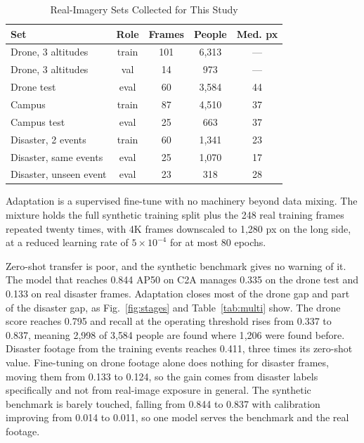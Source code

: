 \documentclass[conference,a4paper]{IEEEtran}
\begin{document}
\begin{table}[htbp]
\caption{Real-Imagery Sets Collected for This Study}
\label{tab:real}
\begin{center}
\small
\setlength{\tabcolsep}{4pt}
\begin{tabular}{|l|c|c|c|c|}
\hline
\textbf{Set} & \textbf{Role} & \textbf{Frames} & \textbf{People} & \textbf{Med. px} \\
\hline
Drone, 3 altitudes & train & 101 & 6{,}313 & --- \\
\hline
Drone, 3 altitudes & val & 14 & 973 & --- \\
\hline
Drone test & eval & 60 & 3{,}584 & 44 \\
\hline
Campus & train & 87 & 4{,}510 & 37 \\
\hline
Campus test & eval & 25 & 663 & 37 \\
\hline
Disaster, 2 events & train & 60 & 1{,}341 & 23 \\
\hline
Disaster, same events & eval & 25 & 1{,}070 & 17 \\
\hline
Disaster, unseen event & eval & 23 & 318 & 28 \\
\hline
\end{tabular}
\end{center}
\end{table}

Adaptation is a supervised fine-tune with no machinery beyond data mixing. The
mixture holds the full synthetic training split plus the 248 real training
frames repeated twenty times, with 4K frames downscaled to 1{,}280 px on the
long side, at a reduced learning rate of $5 \times 10^{-4}$ for at most 80
epochs.

Zero-shot transfer is poor, and the synthetic benchmark gives no warning of it.
The model that reaches 0.844 AP50 on C2A manages 0.335 on the drone test and
0.133 on real disaster frames. Adaptation closes most of the drone gap and part
of the disaster gap, as Fig.~\ref{fig:stages} and Table~\ref{tab:multi} show.
The drone score reaches 0.795 and recall at the operating threshold rises from
0.337 to 0.837, meaning 2{,}998 of 3{,}584 people are found where 1{,}206 were
found before. Disaster footage from the training events reaches 0.411, three
times its zero-shot value. Fine-tuning on drone footage alone does nothing for
disaster frames, moving them from 0.133 to 0.124, so the gain comes from
disaster labels specifically and not from real-image exposure in general. The
synthetic benchmark is barely touched, falling from 0.844 to 0.837 with
calibration improving from 0.014 to 0.011, so one model serves the benchmark and
the real footage.
\end{document}
